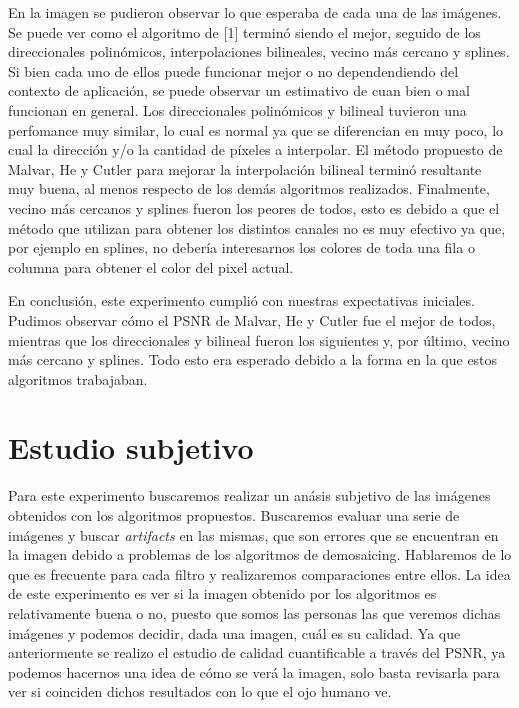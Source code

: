 \documentclass[10pt, a4paper]{article}
\begin{document}
En la imagen se pudieron observar lo que esperaba de cada una de las im\'agenes. Se puede ver como el algoritmo de [1] termin\'o siendo el mejor, seguido de los direccionales polin\'omicos, interpolaciones bilineales, vecino m\'as cercano y splines. Si bien cada uno de ellos puede funcionar mejor o no dependendiendo del contexto de aplicaci\'on, se puede observar un estimativo de cuan bien o mal funcionan en general. Los direccionales polin\'omicos y bilineal tuvieron una perfomance muy similar, lo cual es normal ya que se diferencian en muy poco, lo cual la direcci\'on y/o la cantidad de p\'ixeles a interpolar. El m\'etodo propuesto de Malvar, He y Cutler para mejorar la interpolaci\'on bilineal termin\'o resultante muy buena, al menos respecto de los dem\'as algoritmos realizados. Finalmente, vecino m\'as cercanos y splines fueron los peores de todos, esto es debido a que el m\'etodo que utilizan para obtener los distintos canales no es muy efectivo ya que, por ejemplo en splines, no deber\'ia interesarnos los colores de toda una fila o columna para obtener el color del pixel actual. 

En conclusi\'on, este experimento cumpli\'o con nuestras expectativas iniciales. Pudimos observar c\'omo el PSNR de Malvar, He y Cutler fue el mejor de todos, mientras que los direccionales y bilineal fueron los siguientes y, por \'ultimo, vecino m\'as cercano y splines. Todo esto era esperado debido a la forma en la que estos algoritmos trabajaban. 

\section{Estudio subjetivo}

Para este experimento buscaremos realizar un an\'asis subjetivo de las im\'agenes obtenidos con los algoritmos propuestos. Buscaremos evaluar una serie de im\'agenes y buscar \textit{artifacts} en las mismas, que son errores que se encuentran en la imagen debido a problemas de los algoritmos de demosaicing. Hablaremos de lo que es frecuente para cada filtro y realizaremos comparaciones entre ellos. La idea de este experimento es ver si la imagen obtenido por los algoritmos es relativamente buena o no, puesto que somos las personas las que veremos dichas im\'agenes y podemos decidir, dada una imagen, cu\'al es su calidad. Ya que anteriormente se realizo el estudio de calidad cuantificable a trav\'es del PSNR, ya podemos hacernos una idea de c\'omo se ver\'a la imagen, solo basta revisarla para ver si coinciden dichos resultados con lo que el ojo humano ve. 
\end{document}
